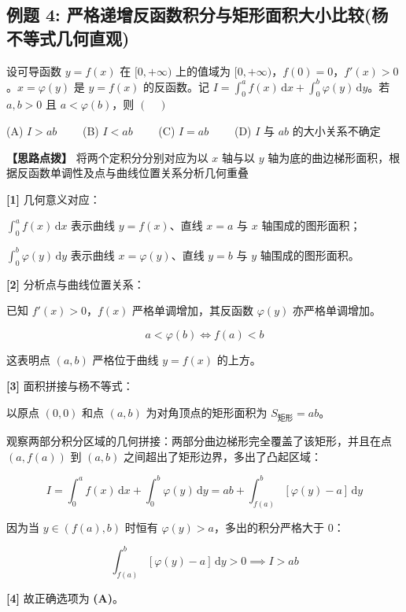 \documentclass[11pt,a4paper,UTF8]{ctexart}
\begin{document}
\subsection{例题 4: 严格递增反函数积分与矩形面积大小比较(杨不等式几何直观)}

设可导函数 $y = f(x)$ 在 $[0, +\infty)$ 上的值域为 $[0, +\infty)$，$f(0) = 0$，$f'(x) > 0$。$x = \varphi(y)$ 是 $y = f(x)$ 的反函数。记 $I = \int_0^a f(x)\,\mathrm{d}x + \int_0^b \varphi(y)\,\mathrm{d}y$。若 $a, b > 0$ 且 $a < \varphi(b)$，则 $(\quad)$

(A) $I > ab \qquad$ (B) $I < ab \qquad$ (C) $I = ab \qquad$ (D) $I$ 与 $ab$ 的大小关系不确定

\textbf{\color{DeepPurple}【思路点拨】} 将两个定积分分别对应为以 $x$ 轴与以 $y$ 轴为底的曲边梯形面积，根据反函数单调性及点与曲线位置关系分析几何重叠


\begin{solbox}[分步推导与答题规范]
\textbf{[1]} 几何意义对应：

$\int_0^a f(x)\,\mathrm{d}x$ 表示曲线 $y = f(x)$、直线 $x = a$ 与 $x$ 轴围成的图形面积；

$\int_0^b \varphi(y)\,\mathrm{d}y$ 表示曲线 $x = \varphi(y)$、直线 $y = b$ 与 $y$ 轴围成的图形面积。

\textbf{[2]} 分析点与曲线位置关系：

已知 $f'(x) > 0$，$f(x)$ 严格单调增加，其反函数 $\varphi(y)$ 亦严格单调增加。


\begin{equation*}
a < \varphi(b) \iff f(a) < b
\end{equation*}


这表明点 $(a, b)$ 严格位于曲线 $y = f(x)$ 的上方。

\textbf{[3]} 面积拼接与杨不等式：

以原点 $(0, 0)$ 和点 $(a, b)$ 为对角顶点的矩形面积为 $S_{\text{矩形}} = ab$。

观察两部分积分区域的几何拼接：两部分曲边梯形完全覆盖了该矩形，并且在点 $(a, f(a))$ 到 $(a, b)$ 之间超出了矩形边界，多出了凸起区域：


\begin{equation*}
I = \int_0^a f(x)\,\mathrm{d}x + \int_0^b \varphi(y)\,\mathrm{d}y = ab + \int_{f(a)}^b [\varphi(y) - a]\,\mathrm{d}y
\end{equation*}


因为当 $y \in (f(a), b)$ 时恒有 $\varphi(y) > a$，多出的积分严格大于 0：


\begin{equation*}
\int_{f(a)}^b [\varphi(y) - a]\,\mathrm{d}y > 0 \implies I > ab
\end{equation*}


\textbf{[4]} 故正确选项为 \textbf{(A)}。
\end{solbox}
\end{document}
